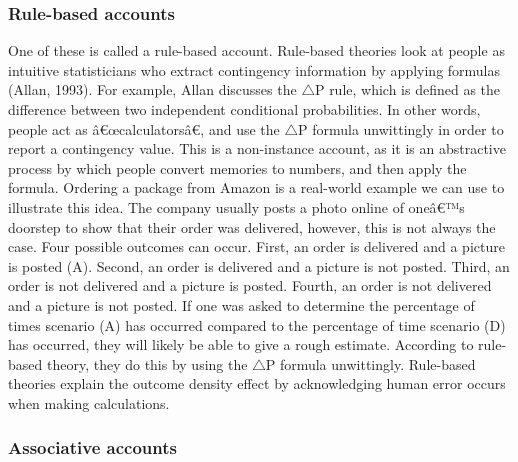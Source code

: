 \documentclass[
  english,
  man,floatsintext]{apa6}
\begin{document}
\hypertarget{rule-based-accounts}{%
\subsubsection{Rule-based accounts}\label{rule-based-accounts}}

One of these is called a rule-based account. Rule-based theories look at people as intuitive statisticians who extract contingency information by applying formulas (Allan, 1993). For example, Allan discusses the \(\triangle\)P rule, which is defined as the difference between two independent conditional probabilities. In other words, people act as â€œcalculatorsâ€, and use the \(\triangle\)P formula unwittingly in order to report a contingency value. This is a non-instance account, as it is an abstractive process by which people convert memories to numbers, and then apply the formula. Ordering a package from Amazon is a real-world example we can use to illustrate this idea. The company usually posts a photo online of oneâ€™s doorstep to show that their order was delivered, however, this is not always the case. Four possible outcomes can occur. First, an order is delivered and a picture is posted (A). Second, an order is delivered and a picture is not posted. Third, an order is not delivered and a picture is posted. Fourth, an order is not delivered and a picture is not posted. If one was asked to determine the percentage of times scenario (A) has occurred compared to the percentage of time scenario (D) has occurred, they will likely be able to give a rough estimate. According to rule-based theory, they do this by using the \(\triangle\)P formula unwittingly. Rule-based theories explain the outcome density effect by acknowledging human error occurs when making calculations.

\hypertarget{associative-accounts}{%
\subsubsection{Associative accounts}\label{associative-accounts}}
\end{document}
